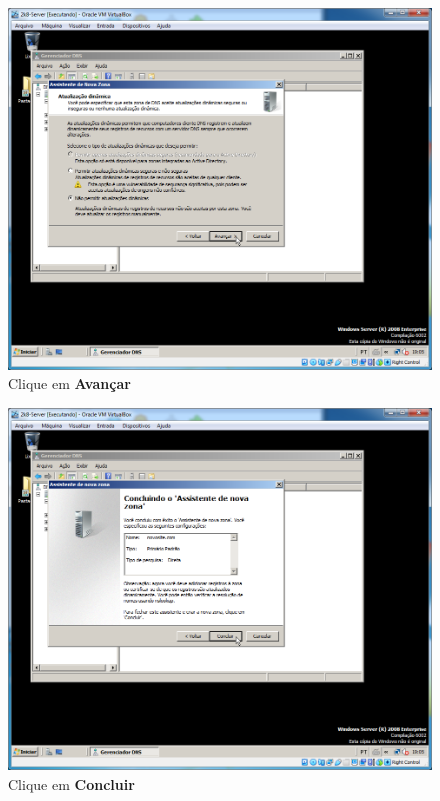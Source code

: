\documentclass[10pt]{article}
\begin{document}
\begin{figure}[H]
    \centering
    \caption{Clique em \textbf{Avançar}}
    \label{fig:5532007}
    \includegraphics[width=\linewidth]{images/IIS/criando_um_novo_site/007.png}
\end{figure}
\begin{figure}[H]
    \centering
    \caption{Clique em \textbf{Concluir}}
    \label{fig:5532008}
    \includegraphics[width=\linewidth]{images/IIS/criando_um_novo_site/008.png}
\end{figure}
\end{document}
